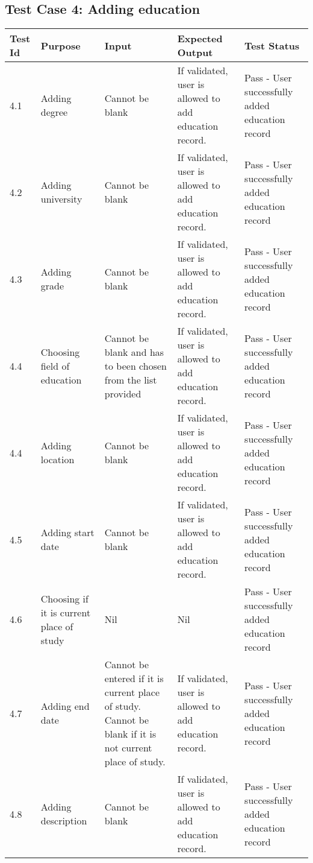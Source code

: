 \documentclass[12pt]{article}
\begin{document}
\subsection {Test Case 4: Adding education}
\begin{center}
	\begin{longtable}{ | p{2cm} | p{3cm} |  p{3cm} | p{3cm} | p{3cm} | }
		\hline
			\textbf{Test Id} & \textbf{Purpose} & \textbf{Input} & \textbf{Expected Output} & \textbf{Test Status} \\
		\hline
			4.1 & Adding degree & Cannot be blank & If validated, user is allowed to add education record. & Pass - User successfully added education record\\
\hline
			4.2 & Adding university & Cannot be blank & If validated, user is allowed to add education record. & Pass - User successfully added education record\\
\hline
			4.3 & Adding grade & Cannot be blank & If validated, user is allowed to add education record. & Pass - User successfully added education record\\
\hline
			4.4 & Choosing field of education & Cannot be blank and has to been chosen from the list provided & If validated, user is allowed to add education record. & Pass - User successfully added education record\\
\hline
			4.4 & Adding location & Cannot be blank & If validated, user is allowed to add education record. & Pass - User successfully added education record\\
\hline
			4.5 & Adding start date & Cannot be blank & If validated, user is allowed to add education record. & Pass - User successfully added education record\\
\hline
			4.6 & Choosing if it is current place of study & Nil & Nil & Pass - User successfully added education record\\
\hline
			4.7 & Adding end date & Cannot be entered if it is current place of study. Cannot be blank if it is not current place of study. & If validated, user is allowed to add education record. & Pass - User successfully added education record\\
\hline
			4.8 & Adding description & Cannot be blank & If validated, user is allowed to add education record. & Pass - User successfully added education record\\

		\hline
	\end{longtable}
\end{center}
\end{document}

